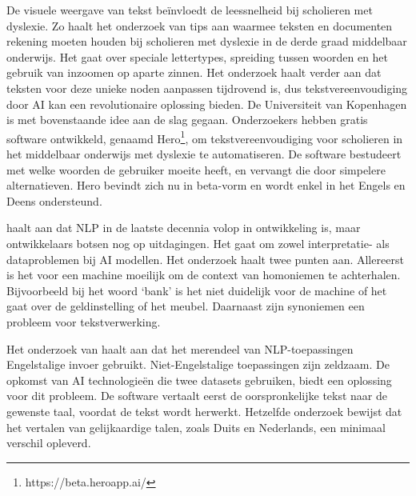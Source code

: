 
De visuele weergave van tekst beïnvloedt de leessnelheid bij scholieren met dyslexie. Zo haalt het onderzoek van \textcite{Rello2012} tips aan waarmee teksten en documenten rekening moeten houden bij scholieren met dyslexie in de derde graad middelbaar onderwijs. Het gaat over speciale lettertypes, spreiding tussen woorden en het gebruik van inzoomen op aparte zinnen. Het onderzoek haalt verder aan dat teksten voor deze unieke noden aanpassen tijdrovend is, dus tekstvereenvoudiging door AI kan een revolutionaire oplossing bieden. De Universiteit van Kopenhagen is met bovenstaande idee aan de slag gegaan. Onderzoekers \textcite{Bingel2018} hebben gratis software ontwikkeld, genaamd Hero\footnote{https://beta.heroapp.ai/}, om tekstvereenvoudiging voor scholieren in het middelbaar onderwijs met dyslexie te automatiseren. De software bestudeert met welke woorden de gebruiker moeite heeft, en vervangt die door simpelere alternatieven. Hero bevindt zich nu in beta-vorm en wordt enkel in het Engels en Deens ondersteund. 

\textcite{Roldos2020} haalt aan dat NLP in de laatste decennia volop in ontwikkeling is, maar ontwikkelaars botsen nog op uitdagingen. Het gaat om zowel interpretatie- als dataproblemen bij AI modellen. Het onderzoek haalt twee punten aan. Allereerst is het voor een machine moeilijk om de context van homoniemen te achterhalen. Bijvoorbeeld bij het woord ‘bank’ is het niet duidelijk voor de machine of het gaat over de geldinstelling of het meubel. Daarnaast zijn synoniemen een probleem voor tekstverwerking.

Het onderzoek van \textcite{Sciforce2020} haalt aan dat het merendeel van NLP-toepassingen Engelstalige invoer gebruikt. Niet-Engelstalige toepassingen zijn zeldzaam. De opkomst van AI technologieën die twee datasets gebruiken, biedt een oplossing voor dit probleem. De software vertaalt eerst de oorspronkelijke tekst naar de gewenste taal, voordat de tekst wordt herwerkt. Hetzelfde onderzoek bewijst dat het vertalen van gelijkaardige talen, zoals Duits en Nederlands, een minimaal verschil opleverd.

